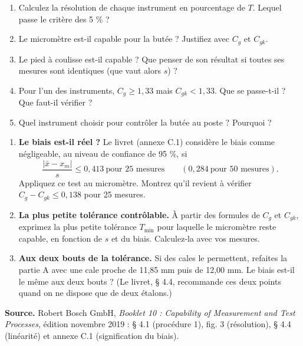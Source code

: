 \documentclass[10pt,a4paper]{article}
\begin{document}
\begin{enumerate}[label=\textcolor{cyan}{\textbf{Q\arabic*.}},leftmargin=22pt]
\item Calculez la résolution de chaque instrument en pourcentage de $T$. Lequel passe le critère des 5 \% ?\reponse
\item Le micromètre est-il capable pour la butée ? Justifiez avec $C_g$ et $C_{gk}$.\reponse
\item Le pied à coulisse est-il capable ? Que penser de son résultat si toutes ses mesures sont identiques (que vaut alors $s$) ?\reponse[2]
\item Pour l'un des instruments, $C_g \ge 1{,}33$ mais $C_{gk} < 1{,}33$. Que se passe-t-il ? Que faut-il vérifier ?\reponse[2]
\item Quel instrument choisir pour contrôler la butée au poste ? Pourquoi ?\reponse
\end{enumerate}

\begin{tcolorbox}[defi]
\begin{enumerate}[label=\textbf{\alph*.},leftmargin=14pt]
\item \textbf{Le biais est-il réel ?} Le livret (annexe C.1) considère le biais comme négligeable, au niveau de confiance de 95 \%, si
\[\frac{\lvert\bar x-x_m\rvert}{s}\le 0{,}413\ \text{pour 25 mesures}\qquad(0{,}284\ \text{pour 50 mesures}).\]
Appliquez ce test au micromètre. Montrez qu'il revient à vérifier $C_g - C_{gk} \le 0{,}138$ pour 25 mesures.
\item \textbf{La plus petite tolérance contrôlable.} À partir des formules de $C_g$ et $C_{gk}$, exprimez la plus petite tolérance $T_{\min}$ pour laquelle le micromètre reste capable, en fonction de $s$ et du biais. Calculez-la avec vos mesures.
\item \textbf{Aux deux bouts de la tolérance.} Si des cales le permettent, refaites la partie A avec une cale proche de 11,85 mm puis de 12,00 mm. Le biais est-il le même aux deux bouts ? (Le livret, § 4.4, recommande ces deux points quand on ne dispose que de deux étalons.)
\end{enumerate}
\end{tcolorbox}

\vfill
{\footnotesize\color{uimm}\textbf{Source.} Robert Bosch GmbH, \emph{Booklet 10 : Capability of Measurement and Test Processes}, édition novembre 2019 : § 4.1 (procédure 1), fig. 3 (résolution), § 4.4 (linéarité) et annexe C.1 (signification du biais).}
\end{document}
